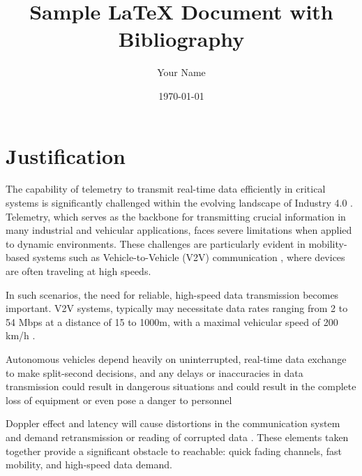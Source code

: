 \documentclass{article}
\title{Sample LaTeX Document with Bibliography}
\author{Your Name}
\date{\today}
\begin{document}
\maketitle

\section{Justification}

The capability of telemetry to transmit real-time data efficiently in critical systems is significantly challenged within the evolving landscape of Industry 4.0 \cite{5GReady}. 
Telemetry, which serves as the backbone for transmitting crucial information in many industrial and vehicular applications, faces severe limitations when applied to dynamic environments. 
These challenges are particularly evident in mobility-based systems such as Vehicle-to-Vehicle (V2V) communication \cite{V2V}, where devices are often traveling at high speeds.

In such scenarios, the need for reliable, high-speed data transmission becomes important. 
V2V systems, typically may necessitate data rates ranging from 2 to 54 Mbps at a distance of 15 to 1000m, with a maximal vehicular speed of 200 km/h \cite{DopplereffectV2V}.

Autonomous vehicles depend heavily on uninterrupted, 
real-time data exchange to make split-second decisions, and any delays or inaccuracies in data transmission could result in dangerous situations \cite{AutonomousRemoteSensing}
and could result in the complete loss of equipment or even pose a danger to personnel

Doppler effect and latency will cause distortions in the communication system and demand retransmission or reading of corrupted data \cite{FastFading}.
These elements taken together provide a significant obstacle to reachable: quick fading channels, fast mobility, and high-speed data demand.



\end{document}
